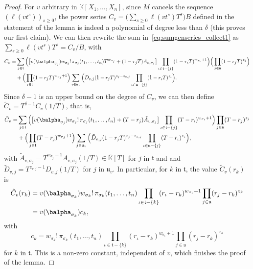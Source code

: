\documentclass[12pt]{article}
\def\K {\ensuremath{\mathbb{K}}}
\def\Kbar {{\ensuremath{\overline{\mathbb{K}}}}}
\begin{document}
\begin{proof}
For $v$ arbitrary in $\K[X_1,\dots,X_n]$, since  $M$ cancels the sequence
$(\ell(v t^s))_{s \ge 0}$, the power series $C_v =
\big(\sum_{s \ge 0} \ell(vt^s)T^s\big)B$ defined in the statement of
the lemma is indeed a polynomial of degree less than $\delta$ (this
proves our first claim). We can then rewrite the
sum in~\eqref{eq:sumgenseries_collect1} as $ \sum_{s \ge 0} \ell(v
t^s)T^s =C_v/B$, with
\begin{align*}
  C_v=&\sum_{j \in \mathfrak{t}} \Big(\big[
    v(\balpha_{\sigma_{j}}) w_{\sigma_{j}}!\, \pi_{\sigma_{j}}(t_1,\dots,t_n)
    T^{w_{\sigma_{j}}} + (1-r_{j} T)A_{v,\sigma_{j}}\big]
  \prod_{\iota \in \mathfrak{t}-\{j\}}(1-r_{\iota} T)^{w_{\sigma_{\iota}}+1}
  \Big)\Big (\prod_{j \in \mathfrak{u}}(1-r_{j} T)^{z_{j}}\Big)\\
  &+
  \Big (\prod_{j \in \mathfrak{t}}(1-r_{j} T)^{w_{\sigma_{j}}+1} \Big)
  \sum_{j \in \mathfrak{u}_v} \Big (D_{v,j} 
  (1-r_j T)^{z_{j}-z_{v,j}}
  \prod_{\iota \in \mathfrak{u}-\{j\}}(1-r_{\iota} T)^{z_{\iota}}\Big).
\end{align*}
Since $\delta-1$ is an upper bound on the degree of $C_v$,
we can then define $\tilde C_v = T^{\delta-1}C_v(1/T)$, that is,
\begin{align*}
  \tilde  C_v=&\sum_{j \in \mathfrak{t}} \Big(\big[
    v(\balpha_{\sigma_{j}})  w_{\sigma_j}!\, \pi_{\sigma_j}(t_1,\dots,t_n)
    + (T-r_j)\tilde A_{v,\sigma_j}\big]
  \prod_{\iota \in \mathfrak{t}-\{j\}}(T-r_{\iota} )^{w_{\sigma_{\iota}}+1}
  \Big)\prod_{j \in \mathfrak{u}}(T-r_j )^{z_j}
  \\
  &+
  \Big(\prod_{j \in \mathfrak{t}}(T-r_{j} )^{w_{\sigma_j}+1}\Big)
  \sum_{j \in \mathfrak{u}_v} \Big (\tilde D_{v,j}
  (1-r_j T)^{z_{j}-z_{v,j}}
  \prod_{\iota \in \mathfrak{u}-\{j\}}(T-r_{\iota} )^{z_{\iota}}\Big),
\end{align*}
with $\tilde A_{v,\sigma_j} = T^{w_{\sigma_j}-1} A_{v,\sigma_j}(1/T) \in \Kbar[T]$
for $j$ in $\mathfrak{t}$ and
and $\tilde D_{v,j}=T^{z_{v,j}-1} D_{v,j}(1/T)$ for $j$ in $\mathfrak{u}_v$. In particular, 
for $k$ in $\mathfrak{t}$,
the value $\tilde C_v(r_k)$ is 
\begin{align*}
  \tilde C_v(r_k)&= v(\balpha_{\sigma_{k}}) w_{\sigma_k}!\, \pi_{\sigma_k}(t_1,\dots,t_n)
  \prod_{\iota \in \mathfrak{t}-\{k\}}(r_\iota-r_{k} )^{w_{\sigma_{\iota}}+1}
\prod_{j \in \mathfrak{u}}(r_j-r_{k} )^{z_{k}}\\
&= v(\balpha_{\sigma_{k}}) c_{k},
\end{align*}
with 
$$c_{k}=
 w_{\sigma_k}!\, \pi_{\sigma_k}(t_1,\dots,t_n)
\prod_{\iota \in \mathfrak{t}-\{k\}}(r_\iota-r_{k} )^{w_{\sigma_{\iota}}+1}
\prod_{j \in \mathfrak{u}}(r_j-r_{k} )^{z_{k}}$$
for $k$ in $\mathfrak{t}$. This is a non-zero constant, independent 
of $v$, which finishes the proof of the lemma.
\end{proof}
\end{document}
